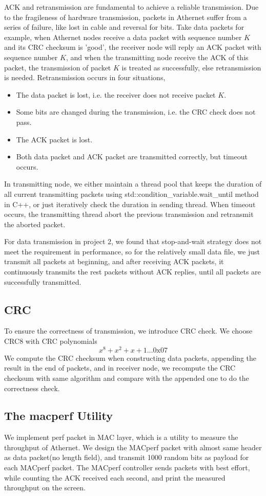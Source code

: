 \documentclass[11pt, conference]{IEEEtran}
\begin{document}
ACK and retransmission are fundamental to achieve a reliable transmission. Due to the fragileness of hardware transmission, packets in 
Athernet suffer from a series of failure, like lost in cable and reversal for bits. Take data packets for example, when Athernet nodes receive
a data packet with sequence number $K$ and its CRC checksum is 'good', the receiver node will reply an ACK packet with sequence number $K$, and when the
transmitting node receive the ACK of this packet, the transmission of packet $K$ is treated as successfully, else retransmission is needed. Retransmission occurs
in four situations,
\begin {itemize}
\item The data packet is lost, i.e. the receiver does not receive packet $K$.
\item Some bits are changed during the transmission, i.e. the CRC check does not pass.
\item The ACK packet is lost.
\item Both data packet and ACK packet are transmitted correctly, but timeout occurs.
\end {itemize}
In transmitting node, we either maintain a thread pool that keeps the duration of all current transmitting packets using std::condition\_variable.wait\_until method
in C++, or just iteratively check the duration in sending thread. When timeout occurs, the transmitting thread abort the previous transmission and retransmit the aborted packet.

For data transmission in project 2, we found that stop-and-wait strategy does not meet the requirement in performance, so for the relatively small data file, we just transmit all
packets at beginning, and after receiving ACK packets, it continuously transmits the rest packets without ACK replies, until all packets are successfully transmitted.

\subsection{CRC}
To ensure the correctness of transmission, we introduce CRC check. We choose CRC8 with CRC polynomials
\[
    x^8 + x^2 + x + 1 \dots 0\text{x}07
\]
We compute the CRC checksum when constructing data packets, appending the result in the end of packets, and in receiver node, we recompute the CRC checksum with same algorithm and compare with the appended one to do the correctness check.
\subsection{The \textsf{macperf} Utility}
We implement perf packet in MAC layer, which is a utility to measure the throughput of Athernet. We design the MACperf packet with almost same header as data packet(no length field), and transmit 1000 random bits as 
payload for each MACperf packet. The MACperf controller sends packets with best effort, while counting the ACK received each second, and print the measured throughput on the screen.
\end{document}
